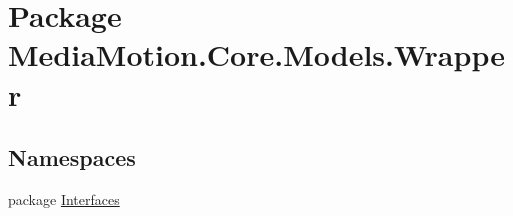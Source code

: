 \hypertarget{namespace_media_motion_1_1_core_1_1_models_1_1_wrapper}{\section{Package Media\+Motion.\+Core.\+Models.\+Wrapper}
\label{namespace_media_motion_1_1_core_1_1_models_1_1_wrapper}
}
\subsection*{Namespaces}
\begin{DoxyCompactItemize}
\item 
package \hyperlink{namespace_media_motion_1_1_core_1_1_models_1_1_wrapper_1_1_interfaces}{Interfaces}
\end{DoxyCompactItemize}
